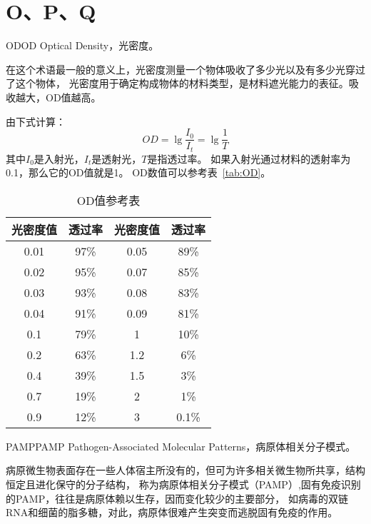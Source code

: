 \documentclass[cn,11pt,chinese]{elegantbook}
\begin{document}
\section{O、P、Q}

\begin{theorem}{OD}{OD} 
 Optical Density，光密度。
 
 在这个术语最一般的意义上，光密度测量一个物体吸收了多少光以及有多少光穿过了这个物体，
 光密度用于确定构成物体的材料类型，是材料遮光能力的表征。吸收越大，OD值越高。

 由下式计算：
 $$OD = \lg \frac{{{I_0}}}{{{I_t}}} = \lg \frac{1}{T}$$
 其中$I_0$是入射光，$I_t$是透射光，$T$是指透过率。
 如果入射光通过材料的透射率为0.1，那么它的OD值就是1。  OD数值可以参考表~\vref{tab:OD}。
\end{theorem}


\begin{table}[h]
  \centering
  \caption{OD值参考表}
    \begin{tabular}{cc|cc}
    \hline
    \textbf{光密度值} & \textbf{透过率} & \textbf{光密度值} & \textbf{透过率}  \\
    \hline
      0.01  & 97\% & 0.05 & 89\%     \\  
     0.02  & 95\% & 0.07 & 85\%     \\ 
     0.03  & 93\% & 0.08 & 83\%     \\
     0.04  & 91\% & 0.09 & 81\%     \\
     \hline
     \hline
      0.1  & 79\% & 1 & 10\%     \\
        0.2  & 63\% & 1.2 & 6\%     \\
        0.4  & 39\% & 1.5 & 3\%     \\
        0.7  & 19\% & 2 & 1\%     \\
        0.9  & 12\% & 3 & 0.1\%     \\
    \hline
    \end{tabular}%
  \label{tab:OD}%
\end{table}%

\begin{theorem}{PAMP}{PAMP}
  Pathogen-Associated Molecular Patterns，病原体相关分子模式。

  病原微生物表面存在一些人体宿主所没有的，但可为许多相关微生物所共享，结构恒定且进化保守的分子结构，
  称为病原体相关分子模式（PAMP）,固有免疫识别的PAMP，往往是病原体赖以生存，因而变化较少的主要部分，
  如病毒的双链RNA和细菌的脂多糖，对此，病原体很难产生突变而逃脱固有免疫的作用。
\end{theorem}
\end{document}
